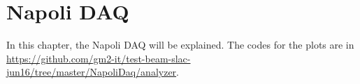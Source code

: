 \chapter{Napoli DAQ}
\label{chap:napolidaq}

In this chapter, the Napoli DAQ will be explained. The codes for the plots are in \url{https://github.com/gm2-it/test-beam-slac-jun16/tree/master/NapoliDaq/analyzer}.
